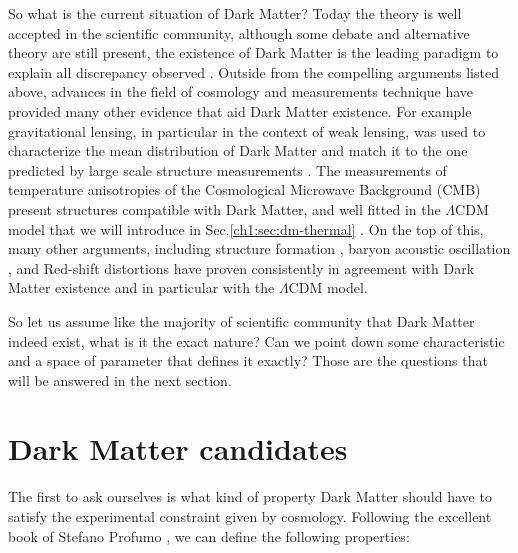 So what is the current situation of Dark Matter? Today the theory is well accepted in the scientific community, although some debate and alternative theory are still present, the existence of Dark Matter is the leading paradigm to explain all discrepancy observed \cite{hooper}. Outside from the compelling arguments listed above, advances in the field of cosmology and measurements technique have provided many other evidence that aid Dark Matter existence. For example gravitational lensing, in particular in the context of weak lensing, was used to characterize the mean distribution of Dark Matter and match it to the one predicted by large scale structure measurements \cite{weak-lensing}. The measurements of temperature anisotropies of the Cosmological Microwave Background (CMB) present structures compatible with Dark Matter, and well fitted in the $\Lambda$CDM model that we will introduce in Sec.\ref{ch1:sec:dm-thermal} \cite{Ade:2015xua}. On the top of this, many other arguments, including structure formation \cite{Navarro:1995iw}, baryon acoustic oscillation \cite{bao}, and Red-shift distortions \cite{Peacock2001} have proven consistently in agreement with Dark Matter existence and in particular with the $\Lambda$CDM model.

So let us assume like the majority of scientific community that Dark Matter indeed exist, what is it the exact nature? Can we point down some characteristic and a space of parameter that defines it exactly? Those are the questions that will be answered in the next section.

\section{Dark Matter candidates}
\label{ch1:sec:dm-candidates}

The first to ask ourselves is what kind of property Dark Matter should have to satisfy the experimental constraint given by cosmology. Following the excellent book of Stefano Profumo \cite{Profumo:2019ujg}, we can define the following properties:

